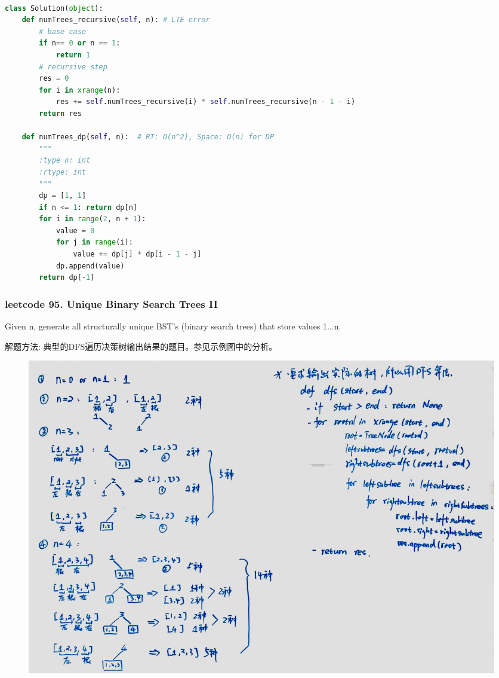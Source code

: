 \documentclass[a4paper,10pt]{article}
\begin{document}
\begin{lstlisting}[language=Python, caption=Problem96. Unique Binary Search Trees]

class Solution(object):
    def numTrees_recursive(self, n): # LTE error
        # base case
        if n== 0 or n == 1: 
            return 1
        # recursive step
        res = 0
        for i in xrange(n):
            res += self.numTrees_recursive(i) * self.numTrees_recursive(n - 1 - i)
        return res

    def numTrees_dp(self, n):  # RT: O(n^2), Space: O(n) for DP
        """
        :type n: int
        :rtype: int
        """
        dp = [1, 1]
        if n <= 1: return dp[n]
        for i in range(2, n + 1):
            value = 0
            for j in range(i):
                value += dp[j] * dp[i - 1 - j]
            dp.append(value)
        return dp[-1]
\end{lstlisting}






\subsubsection{leetcode 95. Unique Binary Search Trees II}
Given n, generate all structurally unique BST's (binary search trees) that store values 1...n. \\

\begin{CJK*}{UTF8}{gbsn}
\noindent 解题方法: 典型的DFS遍历决策树输出结果的题目。参见示例图中的分析。
\end{CJK*}

\begin{figure}[h]
    \includegraphics[width=1\textwidth]{leetcode95.jpg}
    \centering\\
\end{figure}
\end{document}
